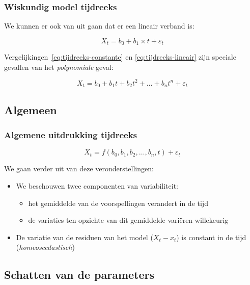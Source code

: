 \documentclass[aspectratio=169]{beamer}
\begin{document}
\begin{frame}
  \frametitle{Wiskundig model tijdreeks}

  We kunnen er ook van uit gaan dat er een lineair verband is:

  \begin{equation}
    X_{t} = b_{0} + b_{1} \times t + \varepsilon_{t}
    \label{eq:tijdreeks-lineair}
  \end{equation}

  Vergelijkingen~\ref{eq:tijdreeks-constante} en \ref{eq:tijdreeks-lineair} zijn speciale gevallen van het \emph{polynomiale} geval:

  \begin{equation}
    X_{t} = b_{0} + b_{1} t + b_{2} t^{2} + \dots + b_{n} t^{n} + \varepsilon_{t}
    \label{eq:tijdreeks-polynomiaal}
  \end{equation}
\end{frame}

\subsection{Algemeen}

\begin{frame}
  \frametitle{Algemene uitdrukking tijdreeks}

  \begin{equation}
    X_{t} = f(b_{0}, b_{1}, b_{2}, \dots , b_{n}, t) + \varepsilon_{t}
    \label{eq:tijdreeks-algemeen}
  \end{equation}

  We gaan verder uit van deze veronderstellingen:

  \begin{itemize}
    \item We beschouwen twee componenten van variabiliteit:
      \begin{itemize}
        \item het gemiddelde van de voorspellingen verandert in de tijd
        \item de variaties ten opzichte van dit gemiddelde variëren willekeurig
      \end{itemize}
    \item De variatie van de residuen van het model ($X_t - x_t$) is constant in de tijd (\emph{homeoscedastisch})
  \end{itemize}
\end{frame}

\subsection{Schatten van de parameters}
\end{document}
